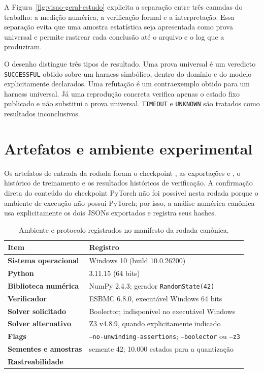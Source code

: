 A Figura~\ref{fig:visao-geral-estudo} explicita a separação entre três camadas
do trabalho: a medição numérica, a verificação formal e a interpretação. Essa
separação evita que uma amostra estatística seja apresentada como prova
universal e permite rastrear cada conclusão até o arquivo e o log que a
produziram.

O desenho distingue três tipos de resultado. Uma prova universal é um veredicto
\texttt{SUCCESSFUL} obtido sobre um harness simbólico, dentro do domínio e do
modelo explicitamente declarados. Uma refutação é um contraexemplo obtido para
um harness universal. Já uma reprodução concreta verifica apenas o estado fixo
publicado e não substitui a prova universal. \texttt{TIMEOUT} e \texttt{UNKNOWN}
são tratados como resultados inconclusivos.

\section{Artefatos e ambiente experimental}

Os artefatos de entrada da rodada foram o checkpoint
, as exportações
 e
, o histórico de treinamento e os
resultados históricos de verificação. A confirmação direta do conteúdo do
checkpoint PyTorch não foi possível nesta rodada porque o ambiente de execução
não possui PyTorch; por isso, a análise numérica canônica usa explicitamente os
dois JSONs exportados e registra seus hashes.

\begin{table}[H]
\centering
\caption{Ambiente e protocolo registrados no manifesto da rodada canônica.}
\label{tab:ambiente}
\begin{tabularx}{\textwidth}{>{\bfseries}p{}Y}
\toprule
Item & Registro \\
\midrule
Sistema operacional & Windows 10 (build 10.0.26200) \\
Python & 3.11.15 (64 bits) \\
Biblioteca numérica & NumPy 2.4.3; gerador \texttt{RandomState(42)} \\
Verificador & ESBMC 6.8.0, executável Windows 64 bits \\
Solver solicitado & Boolector; indisponível no executável Windows \\
Solver alternativo & Z3 v4.8.9, quando explicitamente indicado \\
Flags & \texttt{--no-unwinding-assertions}; \texttt{--boolector} ou \texttt{--z3} \\
Sementes e amostras & semente 42; 10.000 estados para a quantização \\
Rastreabilidade &  \\
\bottomrule
\end{tabularx}
\end{table}


